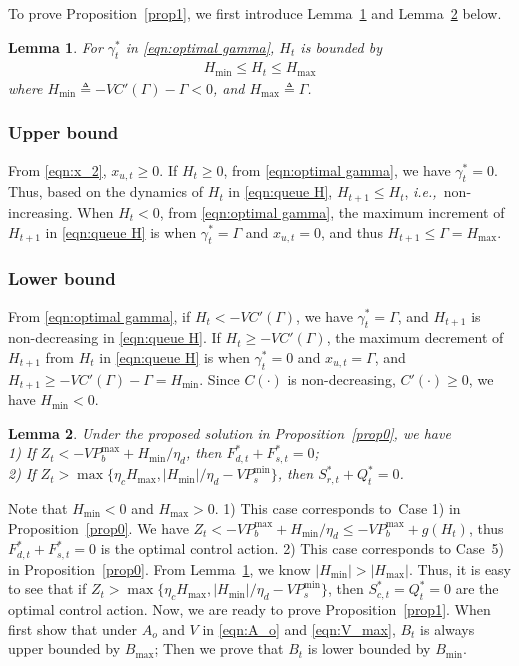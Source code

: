 \documentclass[journal]{IEEEtran}
\def\ie{{\it i.e.,\ \/}}
\newtheorem{lemma}{Lemma}
\begin{document}
To prove Proposition~\ref{prop1}, we first introduce Lemma~\ref{app lemma of H} and Lemma~\ref{app lemma bound of Z} below.
\begin{lemma}\label{app lemma of H}
For $\gamma^*_t$ in \eqref{eqn:optimal gamma}, $H_t$ is bounded by
\begin{align}\label{eqn:app H bound}
H_{\min} \le H_t \le H_{\max}
\end{align}
where $H_{\min}\triangleq-VC'(\Gamma)-\Gamma<0$, and $H_{\max}\triangleq\Gamma$.
\end{lemma}
\IEEEproof
\setcounter{subsubsection}{0}
\subsubsection{Upper bound}
From \eqref{eqn:x_2}, $x_{u,t}\ge 0$. If $H_t\ge 0$, from \eqref{eqn:optimal gamma}, we have $\gamma^*_t=0$. Thus, based on the dynamics of $H_t$ in \eqref{eqn:queue H}, $H_{t+1}\le H_t$, \ie non-increasing. When $H_t < 0$, from \eqref{eqn:optimal gamma}, the maximum increment of $H_{t+1}$ in \eqref{eqn:queue H} is when $\gamma^*_t=\Gamma$ and $x_{u,t}=0$, and thus $H_{t+1} \le \Gamma=H_{\max}$.
\subsubsection{Lower bound}
From \eqref{eqn:optimal gamma}, if $H_t<-VC'(\Gamma)$, we have $\gamma_t^*=\Gamma$, and $H_{t+1}$ is non-decreasing in \eqref{eqn:queue H}. If $H_t\ge -VC'(\Gamma)$, the maximum decrement of $H_{t+1}$ from $H_t$ in \eqref{eqn:queue H} is when $\gamma_t^*=0$ and $x_{u,t}=\Gamma$, and $H_{t+1} \ge -VC'(\Gamma)-\Gamma=H_{\min}$. Since $C(\cdot)$ is non-decreasing, $C'(\cdot)\ge0$, we have $H_{\min}<0$.
\endIEEEproof

\begin{lemma}\label{app lemma bound of Z}
Under the proposed solution in Proposition~\ref{prop0}, we have\\
1) If $Z_t<-VP_{b}^{\max}+H_{\min}/\eta_d$, then $F^*_{d,t}+F^*_{s,t}=0$; \\
2) If $Z_t>\max\{\eta_c H_{\max}, |H_{\min}|/\eta_d-VP_{s}^{\min}\}$, then $S^*_{r,t}+Q^*_t=0$.
\end{lemma}

\IEEEproof
Note that $H_{\min}< 0$ and $H_{\max}>0$.
 1) This case corresponds to~Case 1) in Proposition~\ref{prop0}.
We have $Z_t<-VP_{b}^{\max}+H_{\min}/\eta_d\le -VP_{b}^{\max}+g(H_t)$, thus $F^*_{d,t}+F^*_{s,t}=0$ is the optimal control action.
2) This case corresponds to Case~5) in Proposition~\ref{prop0}.
From Lemma~\ref{app lemma of H}, we know $|H_{\min}|>|H_{\max}|$.
Thus, it is easy to see that if $Z_t>\max\{\eta_cH_{\max}, |H_{\min}|/\eta_d-VP_{s}^{\min}\}$, then $S_{c,t}^*=Q^*_t=0$ are the optimal control action.
\endIEEEproof
Now, we are ready to prove Proposition~\ref{prop1}.  When first show that under $A_o$ and $V$ in \eqref{eqn:A_o} and \eqref{eqn:V_max}, $B_t$ is always upper bounded by $B_{\max}$; Then we prove that $B_t$ is lower bounded by $B_{\min}$.
\end{document}
